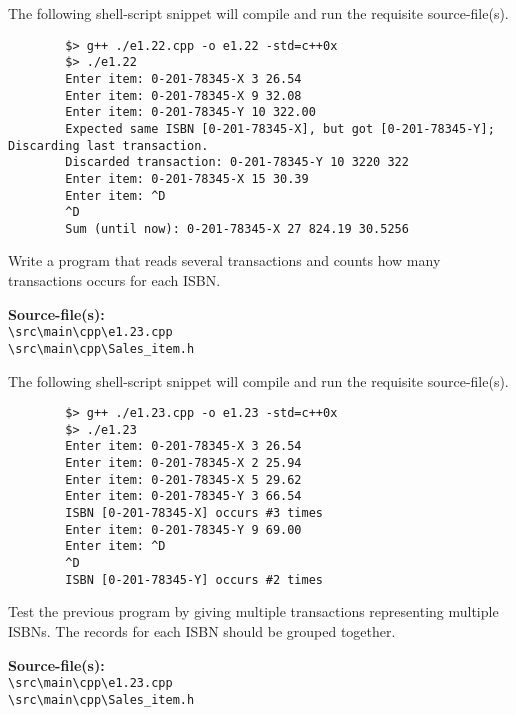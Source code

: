 \documentclass[12pt, a4paper]{article}
\begin{document}
    \noindent The following shell-script snippet will compile and run the requisite source-file(s).
    \begin{verbatim}
        $> g++ ./e1.22.cpp -o e1.22 -std=c++0x
        $> ./e1.22
        Enter item: 0-201-78345-X 3 26.54
        Enter item: 0-201-78345-X 9 32.08
        Enter item: 0-201-78345-Y 10 322.00
        Expected same ISBN [0-201-78345-X], but got [0-201-78345-Y]; Discarding last transaction.
        Discarded transaction: 0-201-78345-Y 10 3220 322
        Enter item: 0-201-78345-X 15 30.39
        Enter item: ^D
        ^D
        Sum (until now): 0-201-78345-X 27 824.19 30.5256
    \end{verbatim}

    \bigskip
    \begin{tcolorbox}[title={Exercise: 1.23}]
        Write a program that reads several transactions and counts how many transactions occurs for each ISBN.
    \end{tcolorbox}
    \noindent\textbf{Source-file(s):}
    \\ \texttt{\textbackslash src\textbackslash main\textbackslash cpp\textbackslash e1.23.cpp}
    \\ \texttt{\textbackslash src\textbackslash main\textbackslash cpp\textbackslash Sales\_item.h}

    \noindent The following shell-script snippet will compile and run the requisite source-file(s).
    \begin{verbatim}
        $> g++ ./e1.23.cpp -o e1.23 -std=c++0x
        $> ./e1.23
        Enter item: 0-201-78345-X 3 26.54
        Enter item: 0-201-78345-X 2 25.94
        Enter item: 0-201-78345-X 5 29.62
        Enter item: 0-201-78345-Y 3 66.54
        ISBN [0-201-78345-X] occurs #3 times
        Enter item: 0-201-78345-Y 9 69.00
        Enter item: ^D
        ^D
        ISBN [0-201-78345-Y] occurs #2 times
    \end{verbatim}

    \bigskip
    \begin{tcolorbox}[title={Exercise: 1.24}]
        Test the previous program by giving multiple transactions representing multiple ISBNs.
        The records for each ISBN should be grouped together.
    \end{tcolorbox}
    \noindent\textbf{Source-file(s):}
    \\ \texttt{\textbackslash src\textbackslash main\textbackslash cpp\textbackslash e1.23.cpp}
    \\ \texttt{\textbackslash src\textbackslash main\textbackslash cpp\textbackslash Sales\_item.h}
\end{document}
